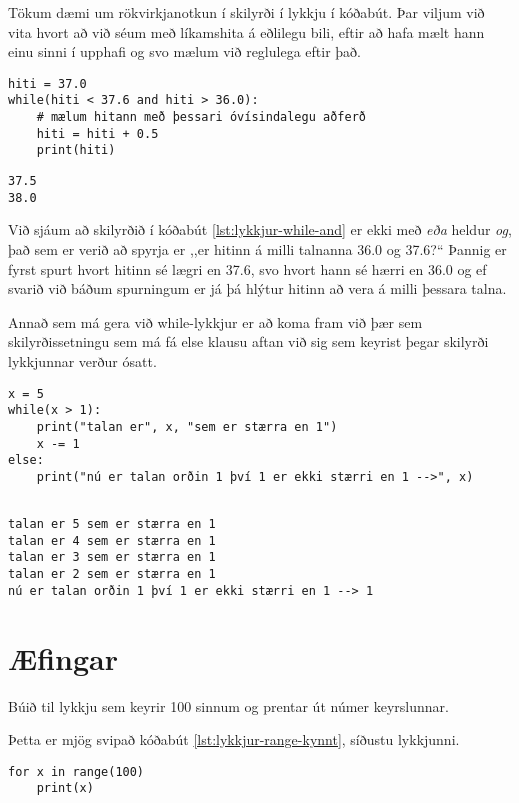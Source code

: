 Tökum dæmi um rökvirkjanotkun í skilyrði í lykkju í kóðabút.
Þar viljum við vita hvort að við séum með líkamshita á eðlilegu bili, eftir að hafa mælt hann einu sinni í upphafi og svo mælum við reglulega eftir það.

\begin{lstlisting}[caption=while-lykkja með og rökvirkjanum, label=lst:lykkjur-while-and]
hiti = 37.0
while(hiti < 37.6 and hiti > 36.0):
	# mælum hitann með þessari óvísindalegu aðferð
	hiti = hiti + 0.5
	print(hiti)
\end{lstlisting}
\lstset{style=uttak}
\begin{lstlisting}
37.5
38.0
\end{lstlisting}
\lstset{style=venjulegt}

Við sjáum að skilyrðið í kóðabút \ref{lst:lykkjur-while-and} er ekki með \emph{eða} heldur \emph{og}, það sem er verið að spyrja er ,,er hitinn á milli talnanna 36.0 og 37.6?“
Þannig er fyrst spurt hvort hitinn sé lægri en 37.6, svo hvort hann sé hærri en 36.0 og ef svarið við báðum spurningum er já þá hlýtur hitinn að vera á milli þessara talna. 

Annað sem má gera við while-lykkjur er að koma fram við þær sem skilyrðissetningu sem má fá else klausu aftan við sig sem keyrist þegar skilyrði lykkjunnar verður ósatt.

\begin{lstlisting}[caption=Að nota else með while, label=lst:lykkjur-while-else]
x = 5
while(x > 1):
	print("talan er", x, "sem er stærra en 1")
	x -= 1 
else:
	print("nú er talan orðin 1 því 1 er ekki stærri en 1 -->", x)
	
\end{lstlisting}
\lstset{style=uttak}
\begin{lstlisting}
talan er 5 sem er stærra en 1
talan er 4 sem er stærra en 1
talan er 3 sem er stærra en 1
talan er 2 sem er stærra en 1
nú er talan orðin 1 því 1 er ekki stærri en 1 --> 1
\end{lstlisting}
\lstset{style=venjulegt}






\newpage
\section{Æfingar}
\begin{exercise}\label{lyk1}
	Búið til lykkju sem keyrir 100 sinnum og prentar út númer keyrslunnar.
\end{exercise}
\begin{Answer}[ref={lyk1}]
Þetta er mjög svipað kóðabút \ref{lst:lykkjur-range-kynnt}, síðustu lykkjunni.
\begin{lstlisting}
for x in range(100)
	print(x)\end{lstlisting}
\end{Answer}

